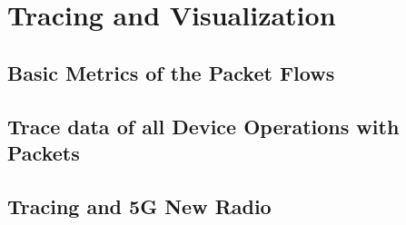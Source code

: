 
\chapter{Tracing and Visualization}
\label{chapter:tracing}

\section{Basic Metrics of the Packet Flows}
\section{Trace data of all Device Operations with Packets}
\section{Tracing and 5G New Radio}
